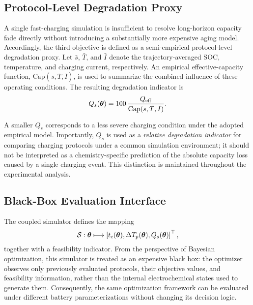 \subsection{Protocol-Level Degradation Proxy}

A single fast-charging simulation is insufficient to resolve long-horizon
capacity fade directly without introducing a substantially more expensive aging
model. Accordingly, the third objective is defined as a semi-empirical
protocol-level degradation proxy. Let $\bar s$, $\bar T$, and $\bar I$ denote
the trajectory-averaged SOC, temperature, and charging current, respectively.
An empirical effective-capacity function,
$\mathrm{Cap}(\bar s,\bar T,\bar I)$, is used to summarize the combined
influence of these operating conditions. The resulting degradation indicator is
\begin{equation}
Q_s(\boldsymbol{\theta})
=
100\,
\frac{Q_{\mathrm{eff}}}
{\mathrm{Cap}(\bar s,\bar T,\bar I)}.
\label{eq:aging}
\end{equation}

A smaller $Q_s$ corresponds to a less severe charging condition under the
adopted empirical model. Importantly, $Q_s$ is used as a \emph{relative
degradation indicator} for comparing charging protocols under a common
simulation environment; it should not be interpreted as a chemistry-specific
prediction of the absolute capacity loss caused by a single charging event.
This distinction is maintained throughout the experimental analysis.

\subsection{Black-Box Evaluation Interface}

The coupled simulator defines the mapping
\begin{equation}
\mathcal{S}:\boldsymbol{\theta}
\longmapsto
\left[
t_c(\boldsymbol{\theta}),
\Delta T_p(\boldsymbol{\theta}),
Q_s(\boldsymbol{\theta})
\right]^{\top},
\label{eq:simulator_map}
\end{equation}
together with a feasibility indicator. From the perspective of Bayesian
optimization, this simulator is treated as an expensive black box: the
optimizer observes only previously evaluated protocols, their objective values,
and feasibility information, rather than the internal electrochemical states
used to generate them. Consequently, the same optimization framework can be
evaluated under different battery parameterizations without changing its
decision logic.
